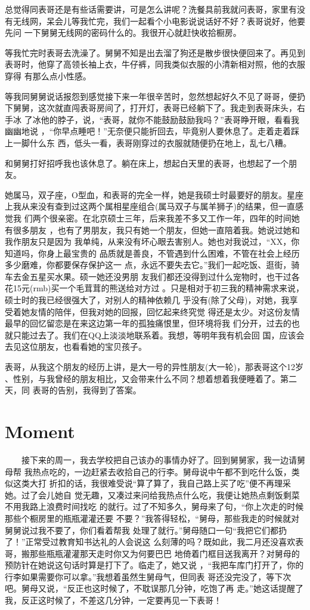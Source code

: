 \documentclass[12pt]{book}
\begin{document}
        总觉得同表哥还是有些话需要讲，可是怎么讲呢？洗餐具前我就问表哥，家里有没
有无线网，呆会儿等我忙完，我们一起看个小电影说说话好不好？表哥说好，他要先问
一下舅舅无线网的密码什么的。我很开心就赶快收拾橱房。

        等我忙完时表哥去洗澡了。舅舅不知是出去溜了狗还是散步很快便回来了。再见到
表哥时，他穿了高领长袖上衣，牛仔裤，同我类似衣服的小清新相对照，他的衣服穿得
有那么点小性感。

        等我同舅舅说话报怨到感觉接下来一年很辛苦时，忽然想起好久不见了哥哥，便扔
下舅舅，这次就直闯表哥房间了，打开灯，表哥已经躺下了。我走到表哥床头，右手冰
了冰他的脖子，说，“表哥，就你不能鼓励鼓励我吗？”表哥睁开眼，看看我幽幽地说
，“你早点睡吧！”无奈便只能折回去，毕竟别人要休息了。走着走着踩上一脚什么东
西，低头一看，表哥刚穿过的衣服就随便扔在地上，乱七八糟。

和舅舅打好招呼我也该休息了。躺在床上，想起白天里的表哥，也想起了一个朋友。

       她属马，双子座，O型血，和表哥的完全一样，她是我硕士时最要好的朋友。星座
上我从来没有查到过这两个属相星座组合(属马双子与属羊狮子)的结果，但一直感觉我
们两个很亲密。在北京硕士三年，后来我差不多又工作一年，四年的时间她有很多朋友
，也有了男朋友，我只有她一个朋友，但她一直陪着我。她说过她和我作朋友只是因为
我单纯，从来没有坏心眼去害别人。她也对我说过，“XX，你知道吗，你身上最宝贵的
品质就是善良，不管遇到什么困难，不管在社会上经历多少磨难，你都要保存保护这一
点，永远不要失去它。”我们一起吃饭、逛街，骑车去金五星买水果。硕一她还没男朋
友我们都还没得到过什么宠物时，也干过各花15元(rmb)买一个毛茸茸的熊送给对方过
。只是相对于初三我的精神需求来说，硕士时的我已经很强大了，对别人的精神依赖几
乎没有(除了父母)，对她，我享受着她友情的陪伴，但我对她的回报，回忆起来终究觉
得还是太少。对这份友情最早的回忆留恋是在来这边第一年的孤独痛恨里，但环境将我
们分开，过去的也就只能过去了。我们在QQ上淡淡地联系着。我想，等明年我有机会回
国，应该会去见这位朋友，也看看她的宝贝孩子。

        表哥，从我这个朋友的经历上讲，是大一号的异性朋友(大一轮)，那表哥这个12岁
、性别，与我曾经的朋友相比，又会带来什么不同？想着想着我便睡着了。第二天，同
表哥的告别，我得到了答案。
\section{Moment}
\label{sec-7-7}

　　接下来的周一，我去学校把自己该办的事情办好了。回到舅舅家，我一边请舅母帮
我热点吃的，一边赶紧去收拾自己的行李。舅母说中午都不到吃什么饭，类似这类大打
折扣的话，我很难受说“算了算了，我自己路上买了吃”便不再理采她。过了会儿她自
觉无趣，又凑过来问给我热点什么吃，我便让她热点剩饭剩菜不用我路上浪费时间找吃
的就行。过了不知多久，舅母来了句，“你上次走的时候那些个橱房里的瓶瓶灌灌还要
不要？”我答得轻松，“舅母，那些我走的时候就对舅舅说过我不要了，你们看着帮我
处理了就行。”舅母随口一句“我把它们都扔了！”正常受过教育知书达礼的人会说这
么刻薄的吗？既如此，我二月还没喜欢表哥，搬那些瓶瓶灌灌那天走时你又为何要巴巴
地倚着门框目送我离开？对舅母的预防针在她说这句话时算是打下了。临走了，她又说
，“我把车库门打开了，你的行李如果需要你可以拿。”我想着虽然生舅母气，但同表
哥还没完没了，等下次吧。舅母又说，“反正也这时候了，不耽误那几分钟，吃饱了再
走。”她这话提醒了我，反正这时候了，不差这几分钟，一定要再见一下表哥！
\end{document}
